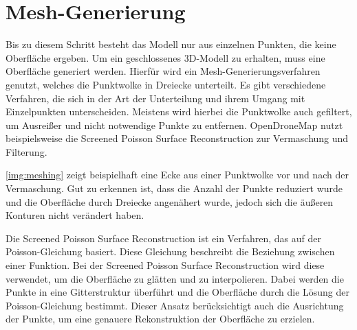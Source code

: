 \documentclass[./00PhotoBox.tex]{subfiles}
\begin{document}
\section{Mesh-Generierung}
Bis zu diesem Schritt besteht das Modell nur aus einzelnen Punkten, die keine Oberfläche ergeben. Um ein geschlossenes 3D-Modell zu erhalten, muss eine Oberfläche generiert werden. Hierfür wird ein Mesh-Generierungsverfahren genutzt, welches die Punktwolke in Dreiecke unterteilt. Es gibt verschiedene Verfahren, die sich in der Art der Unterteilung und ihrem Umgang mit Einzelpunkten unterscheiden. Meistens wird hierbei die Punktwolke auch gefiltert, um Ausreißer und nicht notwendige Punkte zu entfernen. OpenDroneMap nutzt beispielsweise die Screened Poisson Surface Reconstruction zur Vermaschung und Filterung. \citep[S. 52f]{opendronemap}

\autoref{img:meshing} zeigt beispielhaft eine Ecke aus einer Punktwolke vor und nach der Vermaschung. Gut zu erkennen ist, dass die Anzahl der Punkte reduziert wurde und die Oberfläche durch Dreiecke angenähert wurde, jedoch sich die äußeren Konturen nicht verändert haben.

Die Screened Poisson Surface Reconstruction ist ein Verfahren, das auf der Poisson-Gleichung basiert. Diese Gleichung beschreibt die Beziehung zwischen einer Funktion. Bei der Screened Poisson Surface Reconstruction wird diese verwendet, um die Oberfläche zu glätten und zu interpolieren. Dabei werden die Punkte in eine Gitterstruktur überführt und die Oberfläche durch die Lösung der Poisson-Gleichung bestimmt. Dieser Ansatz berücksichtigt auch die Ausrichtung der Punkte, um eine genauere Rekonstruktion der Oberfläche zu erzielen. \citep{spsr}
\end{document}
